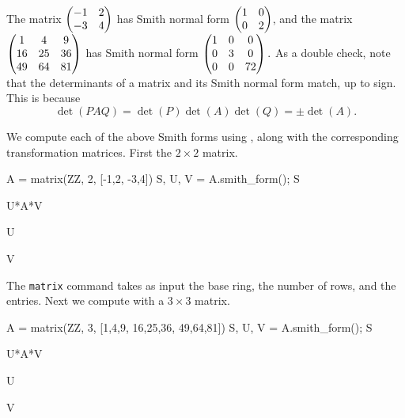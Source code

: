 \begin{example}
The matrix $\left( \begin{matrix}-1&2\\-3&4 \end{matrix}\right)$ has Smith normal form
$\left( \begin{matrix}1&0\\0&2 \end{matrix}\right)$,
and the matrix
$\left( \begin{matrix}1&4&9\\16&25&36\\49&64&81 \end{matrix}\right)$
has Smith normal form
$\left( \begin{matrix}1&0&0\\0&3&0\\0&0&72 \end{matrix}\right).$
As a double check, note that the determinants of a matrix and its
Smith normal form match, up to sign. This is because
$$\det(PAQ) = \det(P)\det(A)\det(Q) = \pm \det(A).$$

We compute each of the above Smith forms using \sage,
along with the corresponding transformation matrices.
First the $2\times 2$ matrix.
\begin{sagecode}
\begin{sagecell}
A = matrix(ZZ, 2, [-1,2, -3,4])
S, U, V = A.smith_form(); S
\end{sagecell}
\begin{sageout}
[1 0]
[0 2]
\end{sageout}
\begin{sagecell}
U*A*V
\end{sagecell}
\begin{sageout}
[1 0]
[0 2]
\end{sageout}
\begin{sagecell}
U
\end{sagecell}
\begin{sageout}
[ 0  1]
[ 1 -1]
\end{sageout}
\begin{sagecell}
V
\end{sagecell}
\begin{sageout}
[1 4]
[1 3]
\end{sageout}
\end{sagecode}
The \sage{} {\tt matrix} command takes as input the base ring, the number
of rows, and the entries.  Next we compute with a $3\times3$ matrix.
\begin{sagecode}
\begin{sagecell}
A = matrix(ZZ, 3, [1,4,9, 16,25,36, 49,64,81])
S, U, V = A.smith_form(); S
\end{sagecell}
\begin{sageout}
[ 1  0  0]
[ 0  3  0]
[ 0  0 72]
\end{sageout}
\begin{sagecell}
U*A*V
\end{sagecell}
\begin{sageout}
[ 1  0  0]
[ 0  3  0]
[ 0  0 72]
\end{sageout}
\begin{sagecell}
U
\end{sagecell}
\begin{sageout}
[  0   0   1]
[  0   1  -1]
[  1 -20 -17]
\end{sageout}
\begin{sagecell}
V
\end{sagecell}
\begin{sageout}
[  47   74   93]
[ -79 -125 -156]
[  34   54   67]
\end{sageout}
\end{sagecode}


\end{example}
